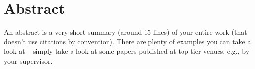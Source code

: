 \chapter*{Abstract}

An abstract is a very short summary (around 15 lines) of your entire work (that doesn't use citations by convention). There are plenty of examples you can take a look at -- simply take a look at some papers published at top-tier venues, e.g., by your supervisor.

